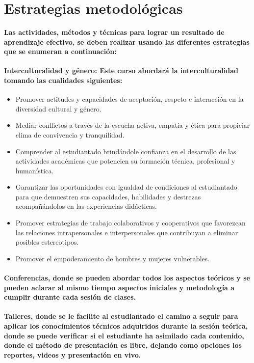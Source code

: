\section*{Estrategias metodológicas}

\paragraph{Las actividades, métodos y técnicas para lograr un resultado de aprendizaje efectivo, se deben realizar usando las diferentes estrategias que se enumeran a continuación:}

\paragraph{\textbf{Interculturalidad y género:} Este curso abordará la interculturalidad tomando las cualidades siguientes:}

\begin{itemize}
    \item Promover actitudes y capacidades de aceptación, respeto e interacción en la diversidad cultural y género.
    \item Mediar conflictos a través de la escucha activa, empatía y ética para propiciar clima de convivencia y tranquilidad.
    \item Comprender al estudiantado brindándole confianza en el desarrollo de las actividades académicas que potencien su formación técnica, profesional y humanística.
    \item Garantizar las oportunidades con igualdad de condiciones al estudiantado para que demuestren sus capacidades, habilidades y destrezas acompañándolos en las experiencias didácticas.
    \item Promover estrategias de trabajo colaborativos y cooperativos que favorezcan las relaciones intrapersonales e interpersonales que contribuyan a eliminar posibles estereotipos.
    \item Promover el empoderamiento de hombres y mujeres vulnerables.
\end{itemize}

\paragraph{\textbf{Conferencias}, donde se pueden abordar todos los aspectos teóricos y se pueden aclarar al mismo tiempo aspectos iniciales y metodología a cumplir durante cada sesión de clases.}

\paragraph{\textbf{Talleres}, donde se le facilite al estudiantado el camino a seguir para aplicar los conocimientos técnicos adquiridos durante la sesión teórica, donde se puede verificar si el estudiante ha asimilado cada contenido, donde el método de presentación es libre, dejando como opciones los reportes, videos y presentación en vivo.}

